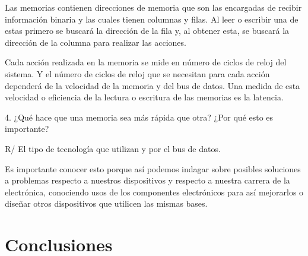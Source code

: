 \documentclass{article}
\begin{document}
Las memorias contienen direcciones de memoria que son las encargadas de recibir información binaria y las cuales tienen columnas y filas. Al leer o escribir una de estas primero se buscará la dirección de la fila y, al obtener esta, se buscará la dirección de la columna para realizar las acciones.

Cada acción realizada en la memoria se mide en número de ciclos de reloj del sistema. Y el número de ciclos de reloj que se necesitan para cada acción dependerá de la velocidad de la memoria y del bus de datos. Una medida de esta velocidad o eficiencia de la lectura o escritura de las memorias es la latencia.


\vspace{1.0cm}
4. ¿Qué hace que una memoria sea más rápida que otra? ¿Por qué esto es importante?

\vspace{0.3cm}
R/ El tipo de tecnología que utilizan y por el bus de datos.

Es importante conocer esto porque así podemos indagar sobre posibles soluciones a problemas respecto a nuestros dispositivos y respecto a nuestra carrera de la electrónica, conociendo usos de los componentes electrónicos para así mejorarlos o diseñar otros dispositivos que utilicen las mismas bases.

\vspace{0.5cm}

\section{Conclusiones} \label{conclulsion}
\end{document}
